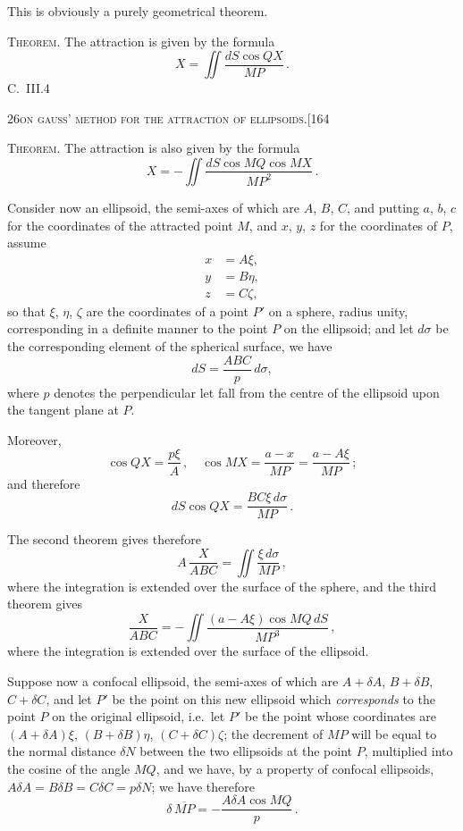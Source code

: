 \documentclass[11pt]{article}
\begin{document}
This is obviously a purely geometrical theorem.

\medskip

\textsc{Theorem.} The attraction is given by the formula
\[
X = \iint\frac{dS\cos QX}{MP}\,.
\]
\hbox{}\hfill C.\ III.\hfill 4

\newpage

\begin{center}
\small\textsc{26}\hfill\textsc{on gauss' method for the attraction of ellipsoids.}\hfill[164
\end{center}

\medskip

\textsc{Theorem.} The attraction is also given by the formula
\[
X = -\iint\frac{dS\cos MQ\cos MX}{MP^{2}}\,.
\]

Consider now an ellipsoid, the semi-axes of which are $A$, $B$, $C$, and putting $a$, $b$, $c$
for the coordinates of the attracted point $M$, and $x$, $y$, $z$ for the coordinates of $P$,
assume
\begin{align*}
x &= A\xi,\\
y &= B\eta,\\
z &= C\zeta,
\end{align*}
so that $\xi$, $\eta$, $\zeta$ are the coordinates of a point $P'$ on a sphere, radius unity, corresponding
in a definite manner to the point $P$ on the ellipsoid; and let $d\sigma$ be the corresponding
element of the spherical surface, we have
\[
dS = \frac{ABC}{p}\,d\sigma,
\]
where $p$ denotes the perpendicular let fall from the centre of the ellipsoid upon the
tangent plane at $P$.

Moreover,
\[
\cos QX = \frac{p\xi}{A}\,,\quad \cos MX = \frac{a - x}{MP} = \frac{a - A\xi}{MP}\,;
\]
and therefore
\[
dS\cos QX = \frac{BC\xi\,d\sigma}{MP}\,.
\]

The second theorem gives therefore
\[
A\,\frac{X}{ABC} = \iint\frac{\xi\,d\sigma}{MP}\,,
\]
where the integration is extended over the surface of the sphere, and the third
theorem gives
\[
\frac{X}{ABC} = -\iint\frac{(a - A\xi)\cos MQ\,dS}{MP^{3}}\,,
\]
where the integration is extended over the surface of the ellipsoid.

Suppose now a confocal ellipsoid, the semi-axes of which are $A + \delta A$, $B + \delta B$,
$C + \delta C$, and let $P'$ be the point on this new ellipsoid which \textit{corresponds} to the point
$P$ on the original ellipsoid, i.e.\ let $P'$ be the point whose coordinates are $(A + \delta A)\xi$,
$(B + \delta B)\eta$, $(C + \delta C)\zeta$; the decrement of $MP$ will be equal to the normal distance
$\delta N$ between the two ellipsoids at the point $P$, multiplied into the cosine of the
angle $MQ$, and we have, by a property of confocal ellipsoids, $A\delta A = B\delta B = C\delta C = p\delta N$;
we have therefore
\[
\delta\,\overline{MP} = -\frac{A\delta A\cos MQ}{p}\,.
\]
\end{document}
